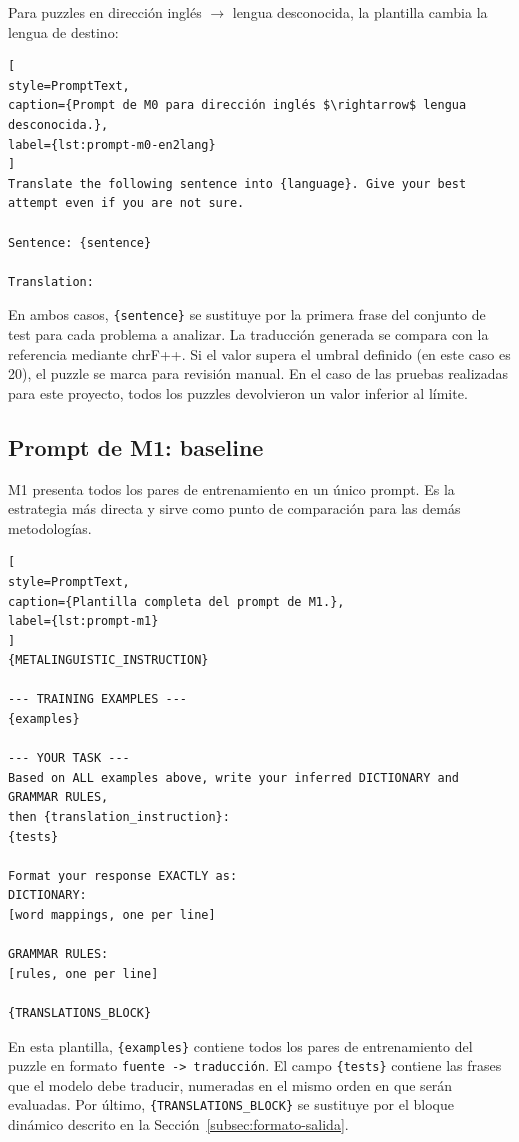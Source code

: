 Para puzzles en dirección inglés $\rightarrow$ lengua desconocida, la plantilla cambia la lengua de destino:

\begin{lstlisting}[
style=PromptText,
caption={Prompt de M0 para dirección inglés $\rightarrow$ lengua desconocida.},
label={lst:prompt-m0-en2lang}
]
Translate the following sentence into {language}. Give your best attempt even if you are not sure.

Sentence: {sentence}

Translation:
\end{lstlisting}

En ambos casos, \texttt{\{sentence\}} se sustituye por la primera frase del conjunto de test para cada problema a analizar. La traducción generada se compara con la referencia mediante chrF++. Si el valor supera el umbral definido (en este caso es 20), el puzzle se marca para revisión manual. En el caso de las pruebas realizadas para este proyecto, todos los puzzles devolvieron un valor inferior al límite.

\subsection{Prompt de M1: baseline}
\label{subsec:prompt-m1}

M1 presenta todos los pares de entrenamiento en un único prompt. Es la estrategia más directa y sirve como punto de comparación para las demás metodologías.

\begin{lstlisting}[
style=PromptText,
caption={Plantilla completa del prompt de M1.},
label={lst:prompt-m1}
]
{METALINGUISTIC_INSTRUCTION}

--- TRAINING EXAMPLES ---
{examples}

--- YOUR TASK ---
Based on ALL examples above, write your inferred DICTIONARY and GRAMMAR RULES,
then {translation_instruction}:
{tests}

Format your response EXACTLY as:
DICTIONARY:
[word mappings, one per line]

GRAMMAR RULES:
[rules, one per line]

{TRANSLATIONS_BLOCK}
\end{lstlisting}

En esta plantilla, \texttt{\{examples\}} contiene todos los pares de entrenamiento del puzzle en formato \texttt{fuente -> traducción}. El campo \texttt{\{tests\}} contiene las frases que el modelo debe traducir, numeradas en el mismo orden en que serán evaluadas. Por último, \texttt{\{TRANSLATIONS\_BLOCK\}} se sustituye por el bloque dinámico descrito en la Sección~\ref{subsec:formato-salida}.


